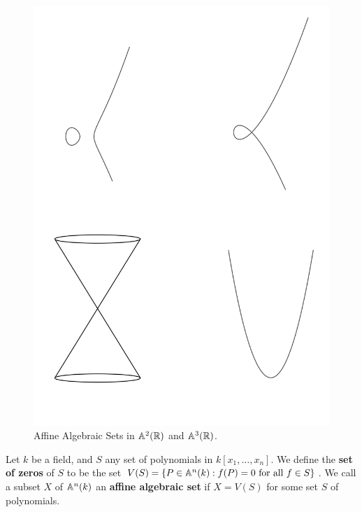 \begin{example}\label{example_2.1}
    \begin{figure}[h]
        \centering
        \includegraphics[scale=0.5]{Figures/Chapter1/hyperplanes.svg}
        \caption{Affine Algebraic Sets in $\mathbb{A}^2(\mathbb{R})$ and $\mathbb{A}^3(\mathbb{R})$.}
        \label{figure_1.1}
    \end{figure}
\end{example}

\begin{definition}
    Let $k$ be a field, and $S$ any set of polynomials in $k[x_1, \dots, x_n]$.
    We define the \textbf{set of zeros} of $S$ to be the set  $V(S)=\{P \in
    \mathbb{A}^n(k) : f(P)=0 \text{ for all } f \in S\}$. We call a subset $X$ of
    $\mathbb{A}^n(k)$ an \textbf{affine algebraic set} if $X=V(S)$ for some set $S$ of
    polynomials.
\end{definition}

